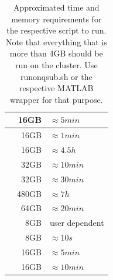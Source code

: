 \documentclass[12pt,a4paper]{scrartcl}
\begin{document}
\begin{table}[h]
\begin{tabular}{l | r | l}
  \nameref{sh:getLyrW} & 16GB & $\approx 5min$ \\\hline
  \nameref{sh:msklbl} & 16GB & $\approx 1min$ \\\hline
  \nameref{sh:prepcoreg} & 16GB & $\approx 4.5h$ \\\hline
  \nameref{sh:prepfct} & 32GB & $\approx 10min$ \\\hline
  \nameref{sh:realign} & 32GB & $\approx 30min$ \\\hline
  \nameref{sh:splitanalyzePRF} & 480GB & $\approx 7h$ \\\hline
  \nameref{sh:tseriesinterp} & 64GB & $\approx 20min$ \\\hline
  \nameref{sh:GUI2ROI} & 8GB & user dependent \\\hline
  \nameref{sh:lbl2msk} & 8GB & $\approx 10s$ \\\hline
  \nameref{sh:mkOver} & 16GB & $\approx 5min$\\\hline
  \nameref{sh:mkprfO} & 16GB & $\approx 10min$ \\\bottomrule
\end{tabular}
\caption[Approximated time and memory requirements when running on qsub]{Approximated time and memory requirements for the respective script to run. Note that everything that is more than 4GB should be run on the cluster. Use runonqsub.sh or the respective MATLAB wrapper for that purpose.}
\label{tab:hardwarerequirements}
\end{table}
\end{document}

